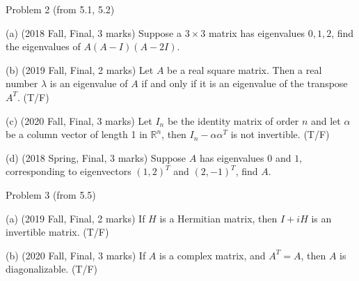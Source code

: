 \documentclass{beamer}
\begin{document}
\begin{frame}{Problem 2 (from 5.1, 5.2)}
\begin{example}

    (a) (2018 Fall, Final, 3 marks) Suppose a $3\times 3$ matrix has eigenvalues $0, 1, 2$, find the eigenvalues of $A(A-I)(A-2I)$.

    (b) (2019 Fall, Final, 2 marks) Let $A$ be a real square matrix. Then a real number $\lambda$ is an eigenvalue of $A$ if and only if it is an eigenvalue of the transpose $A^T$. (T/F)

    (c) (2020 Fall, Final, 3 marks) Let $I_n$ be the identity matrix of order $n$ and let $\alpha$ be a column vector of length 1 in $\mathbb{R}^n$, then $I_n-\alpha \alpha ^T$ is not invertible. (T/F)

    (d) (2018 Spring, Final, 3 marks) Suppose $A$ has eigenvalues $0$ and $1$, corresponding to eigenvectors $(1,2)^T$ and $(2,-1)^T$, find $A$.
\end{example}
\end{frame}

\begin{frame}{Problem 3 (from 5.5)}
\begin{example}

    (a) (2019 Fall, Final, 2 marks) If $H$ is a Hermitian matrix, then $I+iH$ is an invertible matrix. (T/F)

    (b) (2020 Fall, Final, 3 marks) If $A$ is a complex matrix, and $A^T=A$, then $A$ is diagonalizable. (T/F)
\end{example}
\end{frame}
\end{document}
